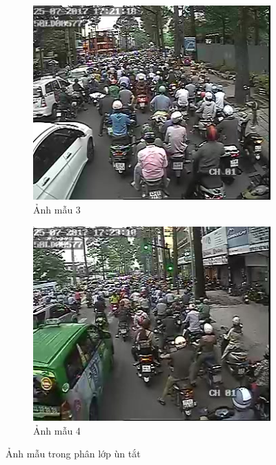 \begin{figure}[h!]
  \centering
  \begin{subfigure}[b]{0.4\linewidth}
    \includegraphics[width=\linewidth]{charts/test-ket.jpg}
    \caption{Ảnh mẫu 3}
  \end{subfigure}
  \begin{subfigure}[b]{0.4\linewidth}
    \includegraphics[width=\linewidth]{charts/test-ket1.jpg}
    \caption{Ảnh mẫu 4}
  \end{subfigure}
  \label{fig:sample2}
  \caption{Ảnh mẫu trong phân lớp ùn tắt}
\end{figure}

